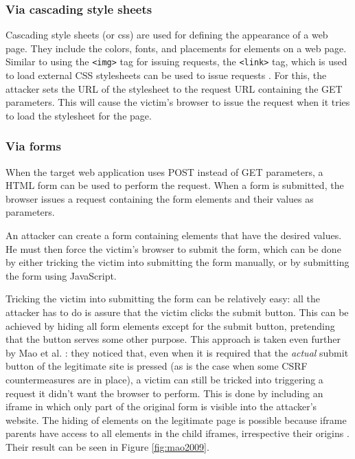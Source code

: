 \subsubsection{Via cascading style sheets}

Cascading style sheets (or \gls{css}) are used for defining the appearance of a web page. They include the colors, fonts, and placements for elements on a web page. Similar to using the \texttt{<img>} tag for issuing requests, the \texttt{<link>} tag, which is used to load external CSS stylesheets can be used to issue requests \cite{Huang2010}. For this, the attacker sets the URL of the stylesheet to the request URL containing the GET parameters. This will cause the victim's browser to issue the request when it tries to load the stylesheet for the page.

\subsubsection{Via forms}\label{forms}

When the target web application uses POST instead of GET parameters, a HTML form can be used to perform the request. When a form is submitted, the browser issues a request containing the form elements and their values as parameters.

An attacker can create a form containing elements that have the desired values. He must then force the victim's browser to submit the form, which can be done by either tricking the victim into submitting the form manually, or by submitting the form using JavaScript.

Tricking the victim into submitting the form can be relatively easy: all the attacker has to do is assure that the victim clicks the submit button. This can be achieved by hiding all form elements except for the submit button, pretending that the button serves some other purpose. This approach is taken even further by Mao et al. \cite{Mao2009}: they noticed that, even when it is required that the \emph{actual} submit button of the legitimate site is pressed (as is the case when some CSRF countermeasures \cite{Jovanovic2006,Johns2006} are in place), a victim can still be tricked into triggering a request it didn't want the browser to perform. This is done by including an iframe in which only part of the original form is visible into the attacker's website. The hiding of elements on the legitimate page is possible because iframe parents have access to all elements in the child iframes, irrespective their origins \cite{Singh2010}. Their result can be seen in Figure \ref{fig:mao2009}.

